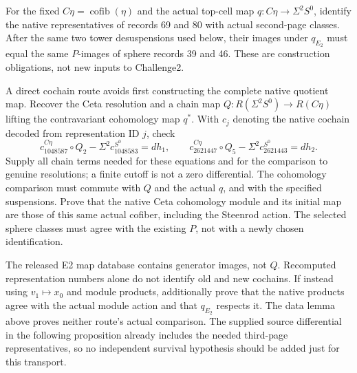 \begin{proposition}
  \label{prop:lin-naturality-map-comparison-245131}
  \notready
  For the fixed $C\eta=\operatorname{cofib}(\eta)$ and the actual
  top-cell map $q:C\eta\to\Sigma^2S^0$, identify the native
  representatives of records 69 and 80 with actual second-page classes.
  After the same two tower desuspensions used below, their images under
  $q_{E_2}$ must equal the same $P$-images of sphere records 39 and 46.
  These are construction obligations, not new inputs to Challenge2.

  A direct cochain route avoids first constructing the complete native
  quotient map. Recover the Ceta resolution and a chain map
  $Q:R(\Sigma^2S^0)\to R(C\eta)$ lifting the contravariant
  cohomology map $q^*$. With $c_j$ denoting the native cochain decoded
  from representation ID $j$, check
  \[
    c^{C\eta}_{1048587}\circ Q_2-\Sigma^2c^{S^0}_{1048583}=dh_1,
    \qquad
    c^{C\eta}_{2621447}\circ Q_5-\Sigma^2c^{S^0}_{2621443}=dh_2.
  \]
  Supply all chain terms needed for these equations and for the comparison
  to genuine resolutions; a finite cutoff is not a zero differential.
  The cohomology comparison must commute with $Q$ and the actual $q$,
  and with the specified suspensions. Prove that the native Ceta
  cohomology module and its initial map are those of this same actual
  cofiber, including the Steenrod action. The selected sphere classes
  must agree with the existing $P$, not with a newly chosen identification.

  The released E2 map database contains generator images, not $Q$.
  Recomputed representation numbers alone do not identify old and new
  cochains. If instead using $v_1\mapsto x_0$ and module products,
  additionally prove that the native products agree with the actual
  module action and that $q_{E_2}$ respects it. The data lemma above
  proves neither route's actual comparison. The supplied source
  differential in the following proposition already includes the needed
  third-page representatives, so no independent survival hypothesis
  should be added just for this transport.
\end{proposition}

